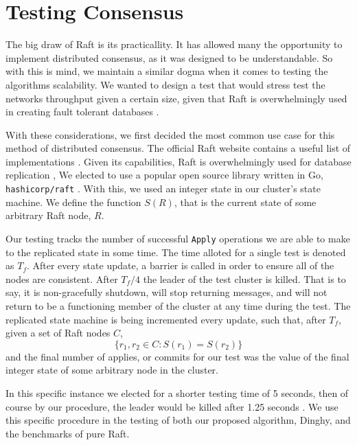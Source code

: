\section{Testing Consensus}

	The big draw of Raft is its practicallity. It has allowed many the opportunity to implement distributed consensus, as it was designed to be understandable. So with this is mind, we maintain a similar dogma when it comes to testing the algorithms scalability. We wanted to design a test that would stress test the networks throughput given a certain size, given that Raft is overwhelmingly used in creating fault tolerant databases \cite{etcd, CockroachDB, TiKV, RethinkDB}.

	With these considerations, we first decided the most common use case for this method of distributed consensus. The official Raft website contains a useful list of implementations \cite{RaftSite}. Given its capabilities, Raft is overwhelmingly used for database replication , 
	We elected to use a popular open source library written in Go, \texttt{hashicorp/raft} \cite{HashicorpRaft}. With this, we used an integer state in our cluster's state machine. We define the function $S(R)$, that is the current state of some arbitrary Raft node, $R$.

	Our testing tracks the number of successful \texttt{Apply} operations we are able to make to the replicated state in some time. The time alloted for a single test is denoted as $T_{f}$. After every state update, a barrier is called in order to ensure all of the nodes are consistent. After $T_{f}/4$ the leader of the test cluster is killed. That is to say, it is non-gracefully shutdown, will stop returning messages, and will not return to be a functioning member of the cluster at any time during the test.
	The replicated state machine is being incremented every update, such that, after $T_{f}$, given a set of Raft nodes $C$, \[\{r_{1},r_{2} \in C: S(r_{1})=S(r_{2})\}\] and the final number of applies, or commits for our test was the value of the final integer state of some arbitrary node in the cluster.

	In this specific instance we elected for a shorter testing time of 5 seconds, then of course by our procedure, the leader would be killed after 1.25 seconds \cite{Dinghy}. We use this specific procedure in the testing of both our proposed algorithm, Dinghy, and the benchmarks of pure Raft.